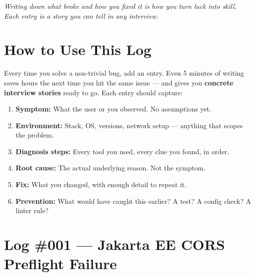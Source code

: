 \documentclass[11pt, letterpaper]{article}
\begin{document}
\vspace{6pt}
\begin{center}\small\itshape
  Writing down what broke and how you fixed it is how you turn luck into skill.
  Each entry is a story you can tell in any interview.
\end{center}
\vspace{4pt}

\section*{How to Use This Log}

Every time you solve a non-trivial bug, add an entry. Even 5 minutes of writing saves hours the next time you hit the same issue --- and gives you \textbf{concrete interview stories} ready to go. Each entry should capture:

\begin{enumerate}[noitemsep]
  \item \textbf{Symptom:} What the user or you observed. No assumptions yet.
  \item \textbf{Environment:} Stack, OS, versions, network setup --- anything that scopes the problem.
  \item \textbf{Diagnosis steps:} Every tool you used, every clue you found, in order.
  \item \textbf{Root cause:} The actual underlying reason. Not the symptom.
  \item \textbf{Fix:} What you changed, with enough detail to repeat it.
  \item \textbf{Prevention:} What would have caught this earlier? A test? A config check? A linter rule?
\end{enumerate}

\section*{Log \#001 --- Jakarta EE CORS Preflight Failure}
\end{document}
